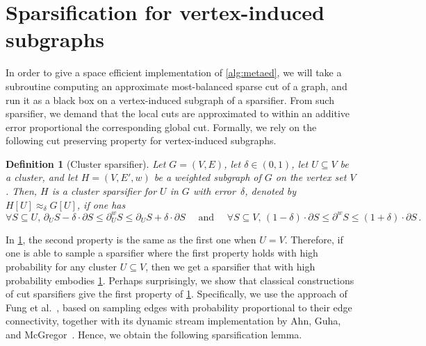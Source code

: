 \documentclass[epsfig,letter,11pt]{article}
\numberwithin{equation}{section}
\newcommand{\uncut}[2]{{\partial}_{#2} #1}
\newcommand{\uncutg}[1]{{\partial} #1}
\newcommand{\wcut}[2]{\partial^w_{#2} #1}
\newcommand{\wcutg}[1]{\partial^w #1}
\newtheorem{definition}[theorem]{Definition}
\begin{document}
\section{Sparsification for vertex-induced subgraphs}
\label{sec:spars}
In order to give a space efficient implementation of \cref{alg:metaed}, we will take a subroutine computing an approximate most-balanced sparse cut of a graph, and run it as a black box on a vertex-induced subgraph of a sparsifier. From such sparsifier, we demand that the local cuts are approximated to within an additive error proportional the corresponding global cut. Formally, we rely on the following cut preserving property for vertex-induced subgraphs.
\begin{definition}[Cluster sparsifier]
	\label{def:spars}
	Let $G=(V,E)$, let $\delta \in (0,1)$, let $U \subseteq V$ be a cluster, and let $H=(V,E',w)$ be a weighted subgraph of $G$ on the vertex set $V$. Then, $H$ is a cluster sparsifier for $U$ in $G$ with error~$\delta$, denoted by $H[U] \approx_\delta G[U]$, if one has
	\begin{equation*}
		\forall S \subseteq U,\,\uncut{S}{U} - \delta \cdot \uncutg{S} \le \wcut{S}{U}  \le \uncut{S}{U} + \delta \cdot \uncutg{S} \quad \text{ and }  \quad \forall S \subseteq V,\, (1-\delta)\cdot \uncutg{S}\le \wcutg{S} \le (1+\delta)\cdot \uncutg{S}\, .
	\end{equation*}
\end{definition}
\noindent
In \cref{def:spars}, the second property is the same as the first one when $U=V$. Therefore, if one is able to sample a sparsifier where the first property holds with high probability for any cluster $U\subseteq V$, then we get a sparsifier that with high probability embodies \cref{def:spars}. Perhaps surprisingly, we show that classical constructions of cut sparsifiers give the first property of \cref{def:spars}. Specifically, we use the approach of Fung et al.~\cite{fungspars}, based on sampling edges with probability proportional to their edge connectivity, together with its dynamic stream implementation by Ahn, Guha, and McGregor~\cite{sparsdynamicstreams}. Hence, we obtain the following sparsification lemma.
\end{document}

